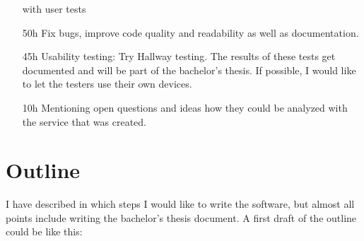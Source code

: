 \documentclass[a4paper]{scrartcl}
\begin{document}
\begin{itemize}
               with user tests
    \item[50h] Fix bugs, improve code quality and readability as well
               as documentation.
    \item[45h] Usability testing: Try Hallway testing. The results
               of these tests get documented and will be part of the
               bachelor's thesis. If possible, I would like
               to let the testers use their own devices.
    \item[10h] Mentioning open questions and ideas how they could be
               analyzed with the service that was created.
\end{itemize}

\section{Outline}
I have described in which steps I would like to write the software,
but almost all points include writing the bachelor's thesis document.
A first draft of the outline could be like this:
\end{document}
